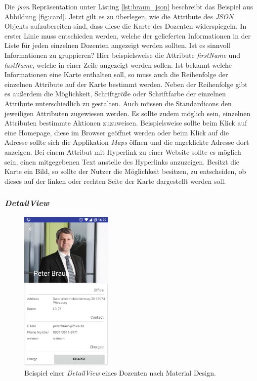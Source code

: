 Die  \textit{\acf{json}} Repräsentation unter Listing \ref{lst:braun_json} beschreibt das Beispiel aus Abbildung \ref{fig:card}.
Jetzt gilt es zu überlegen, wie die Attribute des \textit{JSON} Objekts aufzubereiten sind, dass diese die Karte des Dozenten widerspiegeln. In erster Linie muss entschieden werden, welche der gelieferten Informationen in der Liste für jeden einzelnen Dozenten angezeigt werden sollten. Ist es sinnvoll Informationen zu gruppieren? Hier beispielsweise die Attribute \textit{firstName} und \textit{lastName}, welche in einer Zeile angezeigt werden sollen. Ist bekannt welche Informationen eine Karte enthalten soll, so muss auch die Reihenfolge der einzelnen Attribute auf der Karte bestimmt werden. Neben der Reihenfolge gibt es außerdem die Möglichkeit, Schriftgröße oder Schriftfarbe der einzelnen Attribute unterschiedlich zu gestalten. Auch müssen die Standardicons den jeweiligen Attributen zugewiesen werden. Es sollte zudem möglich sein, einzelnen Attributen bestimmte Aktionen zuzuweisen. Beispielsweise sollte beim Klick auf eine Homepage, diese im Browser geöffnet werden oder beim Klick auf die Adresse sollte sich die Applikation \textit{Maps} öffnen und die angeklickte Adresse dort anzeigen. Bei einem Attribut mit Hyperlink zu einer Website sollte es möglich sein, einen mitgegebenen Text anstelle des Hyperlinks anzuzeigen.
Besitzt die Karte ein Bild, so sollte der Nutzer die Möglichkeit besitzen, zu entscheiden, ob dieses auf der linken oder rechten Seite der Karte dargestellt werden soll.

\newpage

\subsubsection{\textit{DetailView}}

\begin{figure}[H]
	\begin{center}
		\includegraphics[width=0.4\textwidth]{images/detail.png}
		\caption{Beispiel einer \textit{DetailView} eines Dozenten nach Material Design.}
		\label{fig:detail}
	\end{center}
\end{figure}

